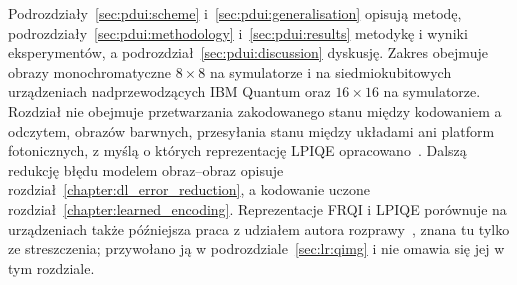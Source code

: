 Podrozdziały~\ref{sec:pdui:scheme} i~\ref{sec:pdui:generalisation} opisują metodę, podrozdziały~\ref{sec:pdui:methodology} i~\ref{sec:pdui:results} metodykę i wyniki eksperymentów, a podrozdział~\ref{sec:pdui:discussion} dyskusję.
Zakres obejmuje obrazy monochromatyczne $8\times8$ na symulatorze i na siedmiokubitowych urządzeniach nadprzewodzących IBM Quantum oraz $16\times16$ na symulatorze.
Rozdział nie obejmuje przetwarzania zakodowanego stanu między kodowaniem a odczytem, obrazów barwnych, przesyłania stanu między układami ani platform fotonicznych, z myślą o których reprezentację LPIQE opracowano~\cite{werner_data_loss_2023,werner_error_reduction_2025}.
Dalszą redukcję błędu modelem obraz--obraz opisuje rozdział~\ref{chapter:dl_error_reduction}, a kodowanie uczone rozdział~\ref{chapter:learned_encoding}.
Reprezentacje FRQI i LPIQE porównuje na urządzeniach także późniejsza praca z udziałem autora rozprawy~\cite{kordasz_image_encoding_2025}, znana tu tylko ze streszczenia; przywołano ją w podrozdziale~\ref{sec:lr:qimg} i nie omawia się jej w tym rozdziale.

